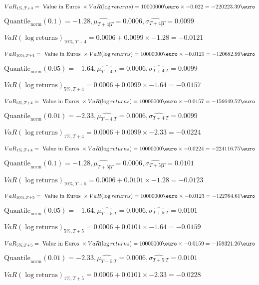 $VaR_{1\%, T + 3} = \text{ Value in Euros } \times VaR(\log returns) = 10 000 000 \text{\euro} \times-0.022 = -220223.39 \text{\euro}$


$\text{Quantile}_\text{norm}(0.1) = -1.28,\hat{\mu_{T+4|T}} = 0.0006, \hat{\sigma_{T+4|T}} = 0.0099$

$VaR(\log \text{returns})_{10\%, T + 4} = 0.0006 + 0.0099\times-1.28 = -0.0121$

$VaR_{10\%, T + 4} = \text{ Value in Euros } \times VaR(\log returns) = 10 000 000 \text{\euro} \times-0.0121 = -120682.99 \text{\euro}$


$\text{Quantile}_\text{norm}(0.05) = -1.64,\hat{\mu_{T+4|T}} = 0.0006, \hat{\sigma_{T+4|T}} = 0.0099$

$VaR(\log \text{returns})_{5\%, T + 4} = 0.0006 + 0.0099\times-1.64 = -0.0157$

$VaR_{5\%, T + 4} = \text{ Value in Euros } \times VaR(\log returns) = 10 000 000 \text{\euro} \times-0.0157 = -156649.52 \text{\euro}$


$\text{Quantile}_\text{norm}(0.01) = -2.33,\hat{\mu_{T+4|T}} = 0.0006, \hat{\sigma_{T+4|T}} = 0.0099$

$VaR(\log \text{returns})_{1\%, T + 4} = 0.0006 + 0.0099\times-2.33 = -0.0224$

$VaR_{1\%, T + 4} = \text{ Value in Euros } \times VaR(\log returns) = 10 000 000 \text{\euro} \times-0.0224 = -224116.75 \text{\euro}$


$\text{Quantile}_\text{norm}(0.1) = -1.28,\hat{\mu_{T+5|T}} = 0.0006, \hat{\sigma_{T+5|T}} = 0.0101$

$VaR(\log \text{returns})_{10\%, T + 5} = 0.0006 + 0.0101\times-1.28 = -0.0123$

$VaR_{10\%, T + 5} = \text{ Value in Euros } \times VaR(\log returns) = 10 000 000 \text{\euro} \times-0.0123 = -122764.61 \text{\euro}$


$\text{Quantile}_\text{norm}(0.05) = -1.64,\hat{\mu_{T+5|T}} = 0.0006, \hat{\sigma_{T+5|T}} = 0.0101$

$VaR(\log \text{returns})_{5\%, T + 5} = 0.0006 + 0.0101\times-1.64 = -0.0159$

$VaR_{5\%, T + 5} = \text{ Value in Euros } \times VaR(\log returns) = 10 000 000 \text{\euro} \times-0.0159 = -159321.26 \text{\euro}$


$\text{Quantile}_\text{norm}(0.01) = -2.33,\hat{\mu_{T+5|T}} = 0.0006, \hat{\sigma_{T+5|T}} = 0.0101$

$VaR(\log \text{returns})_{1\%, T + 5} = 0.0006 + 0.0101\times-2.33 = -0.0228$

